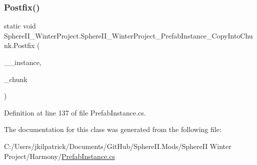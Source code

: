 \subsubsection{\texorpdfstring{Postfix()}{Postfix()}}
{\footnotesize\ttfamily static void Sphere\+I\+I\+\_\+\+Winter\+Project.\+Sphere\+I\+I\+\_\+\+Winter\+Project\+\_\+\+Prefab\+Instance\+\_\+\+Copy\+Into\+Chunk.\+Postfix (\begin{DoxyParamCaption}\item[{Prefab\+Instance}]{\+\_\+\+\_\+instance,  }\item[{Chunk}]{\+\_\+chunk }\end{DoxyParamCaption})\hspace{0.3cm}{\ttfamily [static]}}



Definition at line 137 of file Prefab\+Instance.\+cs.



The documentation for this class was generated from the following file\+:\begin{DoxyCompactItemize}
\item 
C\+:/\+Users/jkilpatrick/\+Documents/\+Git\+Hub/\+Sphere\+I\+I.\+Mods/\+Sphere\+I\+I Winter Project/\+Harmony/\mbox{\hyperlink{_prefab_instance_8cs}{Prefab\+Instance.\+cs}}\end{DoxyCompactItemize}
